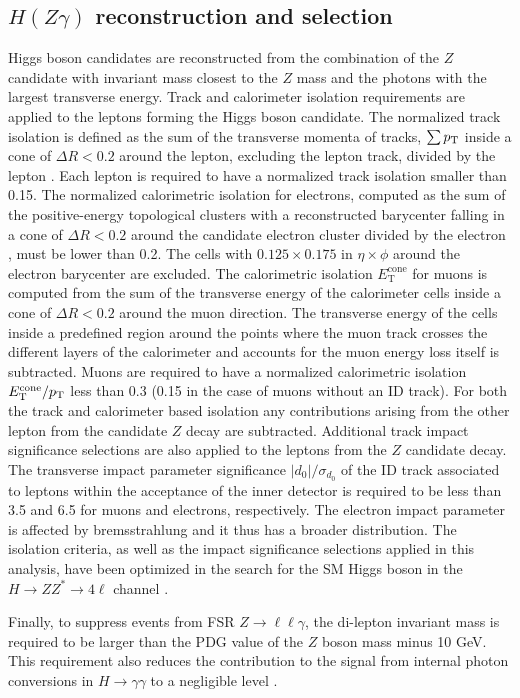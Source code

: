 \subsection{$H(Z\gamma)$ reconstruction and selection}
Higgs boson candidates are reconstructed from the combination of the $Z$ candidate
with invariant mass closest to the $Z$ mass and the photons with the largest transverse
energy. Track and calorimeter isolation requirements are applied to the leptons
forming the Higgs boson candidate. The normalized track isolation is defined as the 
sum of the transverse momenta of tracks, $\sum p_{\mathrm{T}}$ inside a cone of $\Delta R < 0.2$
around the lepton, excluding the lepton track, divided by the lepton \pt. Each lepton
is required to have a normalized track isolation smaller than 0.15. The normalized
calorimetric isolation for electrons, computed as the sum of the positive-energy
topological clusters with a reconstructed barycenter falling in a cone of
$\Delta R < 0.2$ around the candidate electron cluster divided by the electron \et,
must be lower than 0.2. The cells with $0.125 \times 0.175$ in $\eta \times \phi$
around the electron barycenter are excluded. The calorimetric isolation 
$E_{\text{T}}^{\text{cone}}$ for muons is computed from the sum of the transverse
energy of the calorimeter cells inside a cone of $\Delta R < 0.2$ around the muon
direction. The transverse energy of the cells inside a predefined region
around the points where the muon track crosses the different layers of the
calorimeter and accounts for the muon energy loss itself is subtracted. Muons
are required to have a normalized calorimetric isolation 
$E_{\text{T}}^{\text{cone}}/p_{\mathrm{T}}$ less than 0.3 (0.15 in the case of muons without an
ID track). For both the track and calorimeter based isolation any contributions
arising from the other lepton from the candidate $Z$ decay are subtracted.
Additional track impact significance selections are also applied to the leptons
from the $Z$ candidate decay. The transverse impact parameter significance 
$|d_0|/\sigma_{d_0}$ of the ID track associated to leptons within the acceptance of
the inner detector is required to be less than 3.5 and 6.5 for muons and electrons,
respectively. The electron impact parameter is affected by bremsstrahlung and it
thus has a broader distribution. The isolation criteria, as well as the impact
significance selections applied in this analysis, have been optimized in the search
for the SM Higgs boson in the $H \to ZZ^* \to 4\ell$ channel 
\cite{ATLAS-CONF-2012-169}.

Finally, to suppress events from FSR $Z \to \ell\ell\gamma$, the di-lepton
invariant mass is required to be larger than the PDG value of the $Z$ boson mass
minus 10 GeV. This requirement also reduces the contribution to the signal
from internal photon conversions in $H \to \gamma\gamma$ to a negligible level 
\cite{Firan:1032388}.

